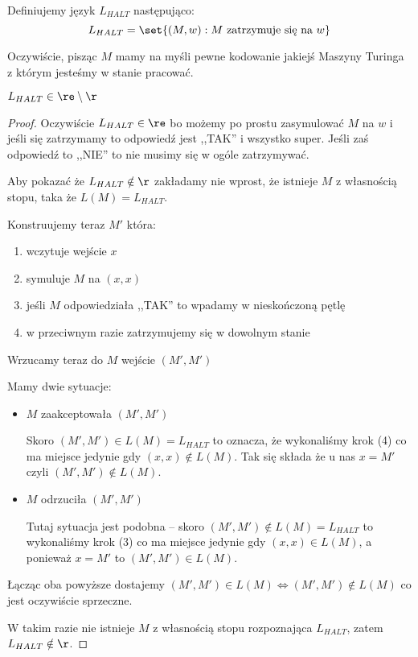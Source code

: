 \begin{definition}
	Definiujemy język \( L_{HALT} \) następująco:
	\[
		L_{HALT} = \set{(M, w) : M \text{ zatrzymuje się na } w}
	\]
\end{definition}

Oczywiście, pisząc \(M\) mamy na myśli pewne kodowanie jakiejś Maszyny Turinga z którym jesteśmy w stanie pracować.

\begin{theorem}
	\( L_{HALT} \in \re \setminus \r \)
\end{theorem}
\begin{proof}
	Oczywiście \( L_{HALT} \in \re \) bo możemy po prostu zasymulować \( M \) na \( w \) i jeśli się zatrzymamy to odpowiedź jest ,,TAK'' i wszystko super. Jeśli zaś odpowiedź to ,,NIE'' to nie musimy się w ogóle zatrzymywać.

	Aby pokazać że \( L_{HALT} \notin \r \) zakładamy nie wprost, że istnieje \( M \) z własnością stopu, taka że \( L(M) = L_{HALT} \).

	Konstruujemy teraz \( M' \) która:
	\begin{enumerate}
		\item wczytuje wejście \( x \)
		\item symuluje \( M \) na \( (x, x) \)
		\item jeśli \( M \) odpowiedziała ,,TAK'' to wpadamy w nieskończoną pętlę
		\item w przeciwnym razie zatrzymujemy się w dowolnym stanie
	\end{enumerate}

	Wrzucamy teraz do \( M \) wejście \( (M', M') \)

	Mamy dwie sytuacje:
	\begin{itemize}
		\item \( M \) zaakceptowała \( (M', M') \)

		      Skoro \( (M', M') \in L(M) = L_{HALT} \) to oznacza, że
		      wykonaliśmy krok (4) co ma miejsce jedynie gdy \( (x, x) \notin L(M) \). Tak się składa że u nas \( x = M' \) czyli \( (M', M') \notin L(M) \).

		\item \( M \) odrzuciła \( (M', M') \)

		      Tutaj sytuacja jest podobna -- skoro \( (M', M') \notin L(M) = L_{HALT} \) to
		      wykonaliśmy krok (3) co ma miejsce jedynie gdy \( (x, x) \in L(M) \), a ponieważ \( x = M' \) to \( (M', M') \in L(M) \).
	\end{itemize}

	Łącząc oba powyższe dostajemy \( (M', M') \in L(M) \iff (M', M') \notin L(M) \) co jest oczywiście sprzeczne.

	W takim razie nie istnieje \( M \) z własnością stopu rozpoznająca \( L_{HALT} \), zatem \( L_{HALT} \notin \r \).
\end{proof}